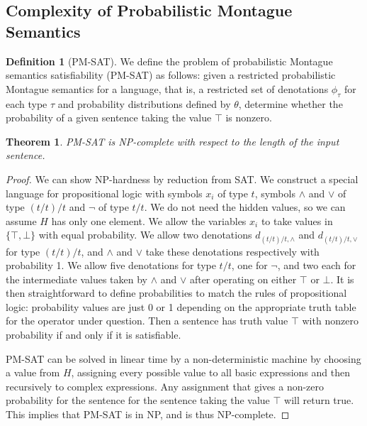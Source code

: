\documentclass[11pt]{article}
\newtheorem*{theorem}{Theorem}
\theoremstyle{definition}
\newtheorem*{definition}{Definition}
\begin{document}
\subsection{Complexity of Probabilistic Montague Semantics}

\begin{definition}[PM-SAT]
  We define the problem of probabilistic Montague semantics
  satisfiability (PM-SAT) as follows: given a restricted probabilistic
  Montague semantics for a language, that is, a restricted set of
  denotations $\phi_\tau$ for each type $\tau$ and probability
  distributions defined by $\theta$, determine whether the probability
  of a given sentence taking the value $\top$ is nonzero.
\end{definition}

\begin{theorem}
  \emph{PM-SAT} is NP-complete with respect to the length of the input
  sentence.
\end{theorem}

\begin{proof}
We can show NP-hardness by reduction from SAT. We construct a special
language for propositional logic with symbols $x_i$ of type $t$,
symbols $\land$ and $\lor$ of type $(t/t)/t$ and $\lnot$ of type
$t/t$. We do not need the hidden values, so we can assume $H$ has only
one element. We allow the variables $x_i$ to take values in $\{\top, \bot\}$
with equal probability. We allow two denotations $d_{(t/t)/t, \land}$
and $d_{(t/t)/t, \lor}$ for type $(t/t)/t$, and $\land$ and $\lor$
take these denotations respectively with probability 1. We allow five
denotations for type $t/t$, one for $\lnot$, and two each for the
intermediate values taken by $\land$ and $\lor$ after operating on
either $\top$ or $\bot$. It is then straightforward to define
probabilities to match the rules of propositional logic: probability
values are just 0 or 1 depending on the appropriate truth table for
the operator under question. Then a sentence has truth value $\top$
with nonzero probability if and only if it is satisfiable.

PM-SAT can be solved in linear time by a non-deterministic machine by
choosing a value from $H$, assigning every possible value to all basic
expressions and then recursively to complex expressions. Any
assignment that gives a non-zero probability for the sentence for the
sentence taking the value $\top$ will return true. This implies that
PM-SAT is in NP, and is thus NP-complete.
\end{proof}
\end{document}
